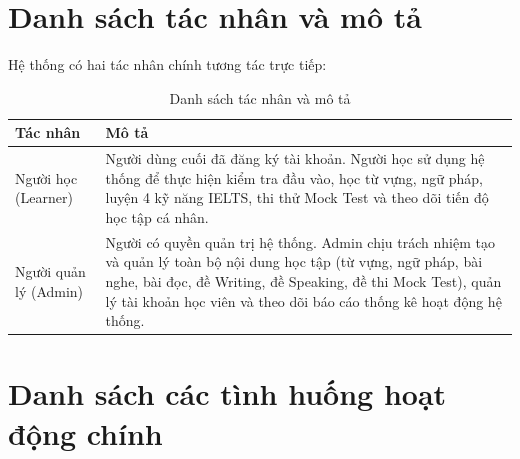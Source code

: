 \documentclass[a4paper,12pt]{extreport}
\begin{document}
\section{Danh sách tác nhân và mô tả}

Hệ thống có hai tác nhân chính tương tác trực tiếp:

\begin{table}[!ht]
    \centering
    \renewcommand{\arraystretch}{1.3}
    \begin{tabularx}{\linewidth}{|l|X|}
        \hline
        \textbf{Tác nhân} & \textbf{Mô tả} \\ \hline
        Người học (Learner) & Người dùng cuối đã đăng ký tài khoản. Người học sử dụng hệ thống để thực hiện kiểm tra đầu vào, học từ vựng, ngữ pháp, luyện 4 kỹ năng IELTS, thi thử Mock Test và theo dõi tiến độ học tập cá nhân. \\ \hline
        Người quản lý (Admin) & Người có quyền quản trị hệ thống. Admin chịu trách nhiệm tạo và quản lý toàn bộ nội dung học tập (từ vựng, ngữ pháp, bài nghe, bài đọc, đề Writing, đề Speaking, đề thi Mock Test), quản lý tài khoản học viên và theo dõi báo cáo thống kê hoạt động hệ thống. \\ \hline
    \end{tabularx}
    \caption{Danh sách tác nhân và mô tả}
    \label{tab:actors}
\end{table}

\section{Danh sách các tình huống hoạt động chính}
\end{document}
